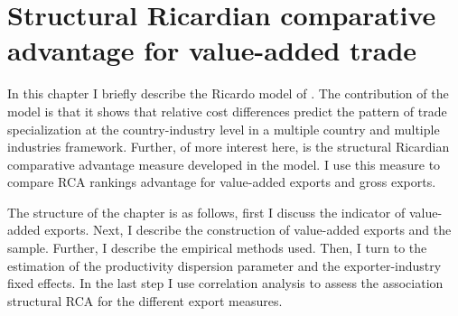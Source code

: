 \chapter{Structural Ricardian comparative advantage for value-added trade}
\label{cha:empirical}
In this chapter I briefly describe the Ricardo model of \textcite{costinot}. The contribution of the model is that it shows that relative cost differences predict the pattern of trade specialization at the country-industry level in a multiple country and multiple industries framework. Further,  of more interest here, is the structural Ricardian comparative advantage measure developed in the model. I use this measure to compare RCA rankings advantage for value-added exports and gross exports.   \par
The structure of the chapter is as follows, first I discuss the indicator of value-added exports. Next, I describe the construction of value-added exports and the sample. Further, I describe the empirical methods used. Then, I turn to the estimation of the productivity dispersion parameter and the exporter-industry fixed effects. In the last step I use correlation analysis to assess the association structural RCA for the different export measures. %
